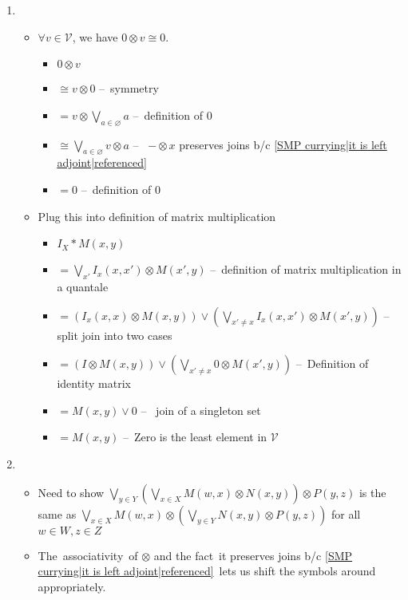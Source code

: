 \begin{enumerate}
    \item
          \begin{itemize}
            \item $\forall v \in \mathcal{V}$, we have $0 \otimes v \cong 0$.
              \begin{itemize}
              \item $0 \otimes v$
              \item $\cong v \otimes 0$ -- \,symmetry\,
              \item $= v \otimes \bigvee_{a \in \varnothing} a$ -- \,definition of $0$\,
              \item $\cong \bigvee_{a \in \varnothing} v \otimes a$ -- \, $-\otimes x$ preserves joins b/c \ref{SMP currying|it is left adjoint|referenced}\,
              \item $= 0$ -- \,definition of 0\,
            \end{itemize}
          \item Plug this into definition of matrix multiplication
          \begin{itemize}
            \item $I_X * M(x,y)$
            \item $= \bigvee_{x'}I_x(x,x')\otimes M(x',y)$ -- \,definition of matrix multiplication in a quantale\,
            \item $=(I_x(x,x)\otimes M(x,y))\vee(\bigvee_{x'\ne x}I_x(x,x')\otimes M(x',y))$ -- \,split join into two cases\,
            \item $=(I\otimes M(x,y))\vee(\bigvee_{x'\ne x}0\otimes M(x',y))$ -- \,Definition of identity matrix\,
            \item $=M(x,y)\vee 0$ -- \, join of a singleton set\,
            \item $=M(x,y)$ -- \,Zero is the least element in $\mathcal{V}$\,
          \end{itemize}
        \end{itemize}
        \item \begin{itemize}
            \item Need to show $\underset{y \in Y}\bigvee (\underset{x\in X}\bigvee M(w,x)\otimes N(x,y))\otimes P(y,z)$ is the same as $\underset{x \in X}\bigvee M(w,x)\otimes(\underset{y \in Y}\bigvee N(x,y) \otimes P(y,z))$ for all $w \in W,z \in Z$
            \item The \,associativity\, of $\otimes$ and the fact \,it preserves joins b/c \ref{SMP currying|it is left adjoint|referenced}\, lets us shift the symbols around appropriately.

       \end{itemize}
  \end{enumerate}
